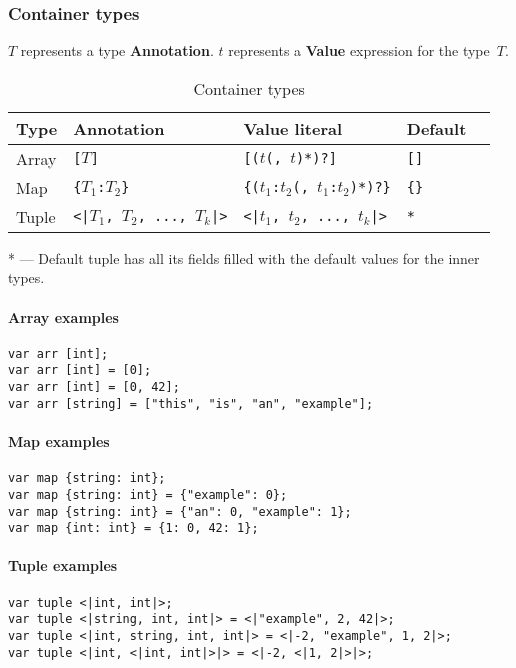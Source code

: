 \documentclass{article}
\begin{document}
\subsubsection{Container types}
$T$ represents a type \textbf{Annotation}. $t$ represents a \textbf{Value}
expression for the type~$T$.

\begin{table}[h]
\centering
\label{container-types}
\begin{tabular}{|l|l|l|l|l|} \hline
\textbf{Type} & \textbf{Annotation}                   & \textbf{Value literal}                      & \textbf{Default} \\ \hline
Array         & \texttt{[$T$]}                        & \texttt{[($t$(, $t$)*)?]}                   & \texttt{[]}      \\ \hline
Map           & \texttt{\{$T_1$:$T_2$\}}              & \texttt{\{($t_1$:$t_2$(, $t_1$:$t_2$)*)?\}} & \texttt{\{\}}    \\ \hline
Tuple         & \texttt{<|$T_1$, $T_2$, ..., $T_k$|>} & \texttt{<|$t_1$, $t_2$, ..., $t_k$|>}       & \texttt{*}       \\ \hline
\end{tabular}
\caption{Container types}
\end{table}

* --- Default tuple has all its fields filled with the default values for the
inner types.

\paragraph{Array examples}
\texttt{var arr [int];} \\
\texttt{var arr [int] = [0];} \\
\texttt{var arr [int] = [0, 42];} \\
\texttt{var arr [string] = ["this", "is", "an", "example"];}

\paragraph{Map examples}
\texttt{var map \{string: int\}; }\\
\texttt{var map \{string: int\} = \{"example": 0\};} \\
\texttt{var map \{string: int\} = \{"an": 0, "example": 1\};} \\
\texttt{var map \{int: int\} = \{1: 0, 42: 1\};}

\paragraph{Tuple examples}
\texttt{var tuple <|int, int|>;} \\
\texttt{var tuple <|string, int, int|> = <|"example", 2, 42|>;} \\
\texttt{var tuple <|int, string, int, int|> = <|-2, "example", 1, 2|>;} \\
\texttt{var tuple <|int, <|int, int|>|> = <|-2, <|1, 2|>|>;}
\end{document}
